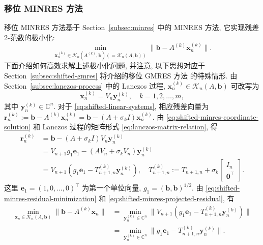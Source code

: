 \subsubsection{{移位 MINRES 方法}}\label{subsec:shifted-minres}
{移位 MINRES 方法基于 Section\ \ref{subsec:minres} 中的 MINRES 方法, 它实现残差 2-范数的极小化:}
\begin{equation}\label{eq:shifted-minres-residual-minimization}\min_{\bm x_n^{(k)}\in\mathcal K_n(A^{(k)},\bm b)(=\mathcal K_n(A,\bm b))}\|\bm b-A^{(k)}\bm x_n^{(k)}\|.\end{equation}
{下面介绍如何高效求解上述极小化问题, 并注意, 以下思想对应于 Section\ \ref{subsec:shifted-gmres} 将介绍的移位 GMRES 方法  的特殊情形.}
{由 Section\ \ref{subsec:lanczos-process} 中的 Lanczos 过程, $\bm x_n^{(k)}\in\mathcal K_n(A,\bm b)$ 可改写为}
\begin{equation}\label{eq:shifted-minres-coordinate-solution}\bm x_n^{(k)}=V_n\bm y_n^{(k)},\quad k=1,2,\ldots,m,\end{equation}
{其中 $\bm y_n^{(k)}\in\mathbb C^n$. 对于 \eqref{eq:shifted-linear-systems}, 相应残差向量为 $\bm r_n^{(k)}:=\bm b-A^{(k)}\bm x_n^{(k)}=\bm b-(A+\sigma_k I)\bm x_n^{(k)}$. 由 \eqref{eq:shifted-minres-coordinate-solution} 和 Lanczos 过程的矩阵形式 \eqref{eq:lanczos-matrix-relation}, 得}
\begin{equation}\label{eq:shifted-minres-projected-residual}\begin{aligned}\bm r_n^{(k)}&=\bm b-(A+\sigma_k I)V_n\bm y_n^{(k)}\\&=V_{n+1}g_1\bm e_1-(AV_n+\sigma_kV_n)\bm y_n^{(k)}\\&=V_{n+1}(g_1\bm e_1-T_{n+1,n}^{(k)}\bm y_n^{(k)}),\quad T_{n+1,n}^{(k)}:=T_{n+1,n}+\sigma_k\begin{bmatrix}I_n\\\bm0^{\top}\end{bmatrix}.\end{aligned}\end{equation}
{这里 $\bm e_1=(1,0,\ldots,0)^{\top}$ 为第一个单位向量, $g_1=(\bm b,\bm b)^{1/2}$. 由 \eqref{eq:shifted-minres-residual-minimization} 和 \eqref{eq:shifted-minres-projected-residual}, 有}
\begin{equation}\label{eq:shifted-minres-least-squares}\begin{aligned}\min_{\bm x_n\in\mathcal K_n(A,\bm b)}\|\bm b-A^{(k)}\bm x_n\|&=\min_{\bm y_n^{(k)}\in\mathbb C^n}\|V_{n+1}(g_1\bm e_1-T_{n+1,n}^{(k)}\bm y_n^{(k)})\|\\&=\min_{\bm y_n^{(k)}\in\mathbb C^n}\|g_1\bm e_1-T_{n+1,n}^{(k)}\bm y_n^{(k)}\|.\end{aligned}\end{equation}

